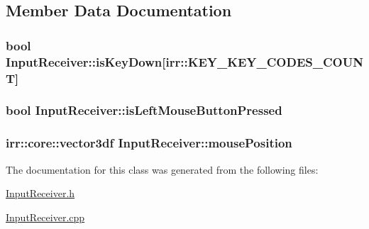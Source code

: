 \subsection{Member Data Documentation}
\hypertarget{class_input_receiver_aaed36ea961cf8eb373fa57f7c1009a05}{
\subsubsection[{is\-Key\-Down}]{\setlength{\rightskip}{0pt plus 5cm}bool Input\-Receiver\-::is\-Key\-Down\mbox{[}irr\-::\-K\-E\-Y\-\_\-\-K\-E\-Y\-\_\-\-C\-O\-D\-E\-S\-\_\-\-C\-O\-U\-N\-T\mbox{]}\hspace{0.3cm}{\ttfamily [private]}}}\label{class_input_receiver_aaed36ea961cf8eb373fa57f7c1009a05}
\hypertarget{class_input_receiver_a4c7159255233769f501c3950bcadc209}{
\subsubsection[{is\-Left\-Mouse\-Button\-Pressed}]{\setlength{\rightskip}{0pt plus 5cm}bool Input\-Receiver\-::is\-Left\-Mouse\-Button\-Pressed\hspace{0.3cm}{\ttfamily [private]}}}\label{class_input_receiver_a4c7159255233769f501c3950bcadc209}
\hypertarget{class_input_receiver_ae15f1ffaada0f66bbf3d727e67b0c3a5}{
\subsubsection[{mouse\-Position}]{\setlength{\rightskip}{0pt plus 5cm}irr\-::core\-::vector3df Input\-Receiver\-::mouse\-Position\hspace{0.3cm}{\ttfamily [private]}}}\label{class_input_receiver_ae15f1ffaada0f66bbf3d727e67b0c3a5}


The documentation for this class was generated from the following files\-:\begin{DoxyCompactItemize}
\item 
\hyperlink{_input_receiver_8h}{Input\-Receiver.\-h}\item 
\hyperlink{_input_receiver_8cpp}{Input\-Receiver.\-cpp}\end{DoxyCompactItemize}
